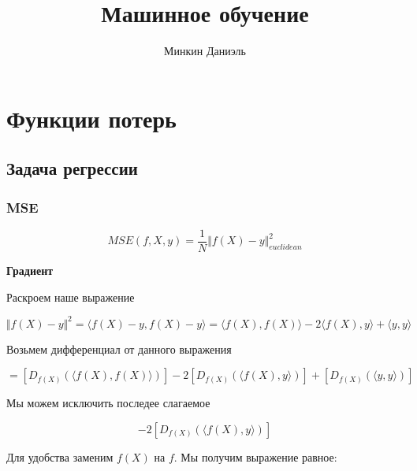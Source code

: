 \documentclass{article}
\title{Машинное обучение}
\author{Минкин Даниэль}
\begin{document}
    \maketitle

    \tableofcontents %

    \section{Функции потерь}

    \subsection{Задача регрессии}

    \subsubsection{MSE}

    \begin{equation}
        MSE(f, X, y) =  \frac{1}{N} \Vert f(X) -  y \Vert_{euclidean}^{2} 
    \end{equation}

    \quad 

    \textbf{Градиент}

    \quad 

    Раскроем наше выражение

    \begin{equation}
        \Vert f(X) - y \Vert^{2} = \langle f(X) - y, f(X) - y \rangle = \langle f(X), f(X)  \rangle - 2 \langle f(X), y  \rangle + \langle y, y  \rangle
    \end{equation}

    Возьмем дифференциал от данного выражения 

    \begin{equation}
        [D_{f(X)} (\Vert f(X) - y \Vert)] = [D_{f(X)} (\langle f(X), f(X)  \rangle)] - 2 [D_{f(X)} (\langle f(X), y  \rangle)] + [D_{f(X)} (\langle y, y  \rangle)]
    \end{equation}

    Мы можем исключить последее слагаемое

    \begin{equation}
        [D_{f(X)} (\langle f(X), f(X)  \rangle)] - 2 [D_{f(X)} (\langle f(X), y  \rangle)] 
    \end{equation}

    Для удобства заменим $f(X)$ на $f$. Мы получим выражение равное: 
\end{document}
